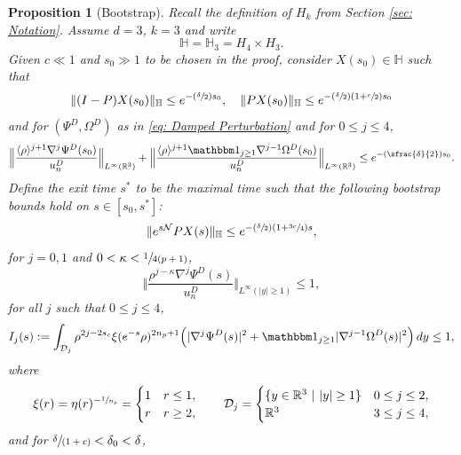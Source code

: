\documentclass[10pt]{amsart}
\newcommand{\Psfrac}[2]{(\sfrac{#1}{#2})}
\newcommand{\spfrac}[2]{\sfrac{#1}{(#2)}}
\theoremstyle{plain}
\newtheorem{proposition}{Proposition}[section]
\theoremstyle{definition}
\begin{document}
\begin{proposition}[Bootstrap]
\label{prop: Bootstrap}
Recall the definition of $H_k$ from Section \ref{sec: Notation}. Assume $d=3$, $k=3$ and write
\[
\mathbb H=\mathbb H_3= H_4\times H_3.
\]
Given $c\ll 1$ and $s_0\gg1$ to be chosen in the proof, consider $X(s_0)\in \mathbb H$ such that
\begin{equation}
\label{eq: Choice of Initial Value 1}
\Vert (I-P)X(s_0)\Vert_{\mathbb H}\le e^{-\Psfrac{\delta}{2}s_0}, \quad \Vert PX(s_0)\Vert_{\mathbb H}\le e^{-\Psfrac{\delta}{2}(1+\sfrac{c}{2})s_0}
\end{equation}
and for $(\Psi^D,\Omega^D)$ as in \eqref{eq: Damped Perturbation} and for $0\le j\le 4$,
\begin{equation}
\label{eq: Choice of Initial Value 2}
\Big\Vert \frac{\langle\rho\rangle^{j+1}\nabla ^j\Psi^D(s_0)}{u_n^D}\Big\Vert_{L^\infty(\mathbb R^3)}+\Big\Vert \frac{\langle\rho\rangle^{j+1}\mathbbm 1_{j\ge1}\nabla ^{j-1}\Omega^D(s_0)}{u_n^D}\Big\Vert_{L^\infty(\mathbb R^3)}\le e^{- \Psfrac{\delta}{2}s_0}.
\end{equation}
Define the exit time $s^*$ to be the maximal time such that the following bootstrap bounds hold on $s\in [s_0,s^*]$:
\begin{equation}
\label{eq: Bootstrap Bound 1}
\Vert e^{s\mathcal N}PX(s)\Vert_{\mathbb H}\le e^{-\Psfrac{\delta}{2}(1+\sfrac{3c}{4})s},
\end{equation}
for $j=0, 1$ and $0<\kappa<\sfrac{1}{4(p+1)}$,
\begin{equation}
\label{eq: Bootstrap Bound 2}
\Big\Vert \frac{\rho^{j-\kappa}\nabla ^j\Psi^D(s)}{u_n^D}\Big\Vert_{L^\infty(|y|\ge1)}\le 1,
\end{equation}
for all $j$ such that $0\le j \le 4$,
\begin{equation}
\label{eq: Bootstrap Bound 3}
I_j(s):=\int_{\mathcal D_j} \rho^{2j-2s_c}\xi(e^{-s}\rho)^{2n_p+1}\Big(|\nabla^j\Psi^D(s)|^2+\mathbbm 1_{j\ge1}|\nabla^{j-1}\Omega^D(s)|^2\Big)\,dy\le1,
\end{equation}
where
\[
\xi(r)=\eta(r)^{-\sfrac{1}{n_p}}=\begin{cases}
1 & r\le1, \\
r & r\ge 2,
\end{cases}\qquad \mathcal D_j=\begin{cases}
\{y\in \mathbb R^3\ |\ |y|\ge1\} & 0\le j\le 2, \\
\mathbb R^3 & 3\le j\le 4,
\end{cases}
\]
and for $\spfrac{\delta}{1+c}<\delta_0<\delta$,

\end{proposition}
\end{document}
